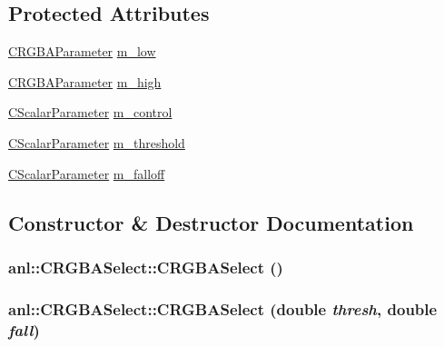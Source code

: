 \subsection*{Protected Attributes}
\begin{DoxyCompactItemize}
\item 
\hyperlink{classanl_1_1CRGBAParameter}{CRGBAParameter} \hyperlink{classanl_1_1CRGBASelect_af4ae5badd45bf21097f2a1ef98ef9edf}{m\_\-low}
\item 
\hyperlink{classanl_1_1CRGBAParameter}{CRGBAParameter} \hyperlink{classanl_1_1CRGBASelect_a399acd7be46f45328c09cd5c617f51a7}{m\_\-high}
\item 
\hyperlink{classanl_1_1CScalarParameter}{CScalarParameter} \hyperlink{classanl_1_1CRGBASelect_aabebfb2e6c93c827504b836841b1502a}{m\_\-control}
\item 
\hyperlink{classanl_1_1CScalarParameter}{CScalarParameter} \hyperlink{classanl_1_1CRGBASelect_a0dd0bccc2e375330934c7d2984f99b3b}{m\_\-threshold}
\item 
\hyperlink{classanl_1_1CScalarParameter}{CScalarParameter} \hyperlink{classanl_1_1CRGBASelect_a74f131f30fa7d331f6b525cc0ccadd76}{m\_\-falloff}
\end{DoxyCompactItemize}


\subsection{Constructor \& Destructor Documentation}
\hypertarget{classanl_1_1CRGBASelect_ac44fdbc401ee8c47beda16f3686176ad}{
\subsubsection[{CRGBASelect}]{\setlength{\rightskip}{0pt plus 5cm}anl::CRGBASelect::CRGBASelect ()}}
\label{classanl_1_1CRGBASelect_ac44fdbc401ee8c47beda16f3686176ad}
\hypertarget{classanl_1_1CRGBASelect_a1471a59f01a573da7bad4fba5dabbbd8}{
\subsubsection[{CRGBASelect}]{\setlength{\rightskip}{0pt plus 5cm}anl::CRGBASelect::CRGBASelect (double {\em thresh}, \/  double {\em fall})}}
\label{classanl_1_1CRGBASelect_a1471a59f01a573da7bad4fba5dabbbd8}



